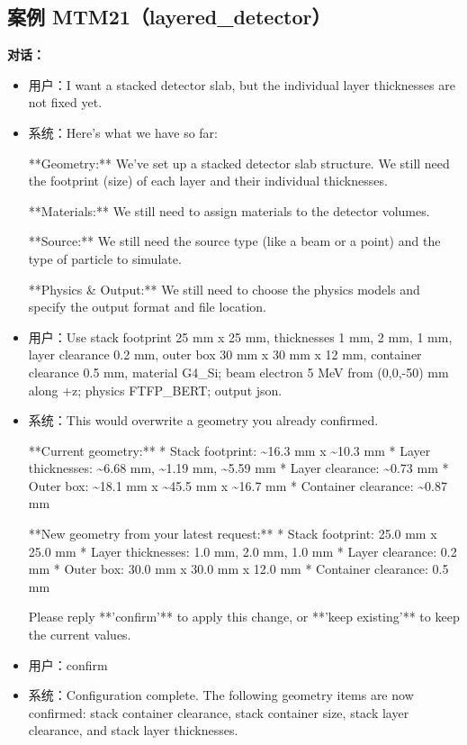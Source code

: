 \documentclass[11pt]{ctexart}
\begin{document}
\subsection{案例 MTM21（layered\_detector）}
\textbf{对话：}
\begin{itemize}
\item 用户：I want a stacked detector slab, but the individual layer thicknesses are not fixed yet.
\item 系统：Here's what we have so far:

**Geometry:** We've set up a stacked detector slab structure. We still need the footprint (size) of each layer and their individual thicknesses.

**Materials:** We still need to assign materials to the detector volumes.

**Source:** We still need the source type (like a beam or a point) and the type of particle to simulate.

**Physics \& Output:** We still need to choose the physics models and specify the output format and file location.
\item 用户：Use stack footprint 25 mm x 25 mm, thicknesses 1 mm, 2 mm, 1 mm, layer clearance 0.2 mm, outer box 30 mm x 30 mm x 12 mm, container clearance 0.5 mm, material G4\_Si; beam electron 5 MeV from (0,0,-50) mm along +z; physics FTFP\_BERT; output json.
\item 系统：This would overwrite a geometry you already confirmed.

**Current geometry:**
*   Stack footprint: \textasciitilde{}16.3 mm x \textasciitilde{}10.3 mm
*   Layer thicknesses: \textasciitilde{}6.68 mm, \textasciitilde{}1.19 mm, \textasciitilde{}5.59 mm
*   Layer clearance: \textasciitilde{}0.73 mm
*   Outer box: \textasciitilde{}18.1 mm x \textasciitilde{}45.5 mm x \textasciitilde{}16.7 mm
*   Container clearance: \textasciitilde{}0.87 mm

**New geometry from your latest request:**
*   Stack footprint: 25.0 mm x 25.0 mm
*   Layer thicknesses: 1.0 mm, 2.0 mm, 1.0 mm
*   Layer clearance: 0.2 mm
*   Outer box: 30.0 mm x 30.0 mm x 12.0 mm
*   Container clearance: 0.5 mm

Please reply **'confirm'** to apply this change, or **'keep existing'** to keep the current values.
\item 用户：confirm
\item 系统：Configuration complete. The following geometry items are now confirmed: stack container clearance, stack container size, stack layer clearance, and stack layer thicknesses.
\end{itemize}
\end{document}
